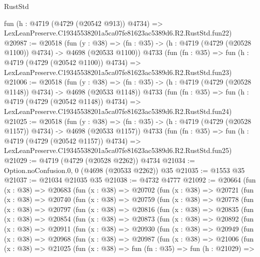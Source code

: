 \begin{lexlean}{RustStd}
\begin{coremodule}
    fun (h : @4719 (@4729 (@20542 @913)) @4734) =>
    LexLeanPreserve.C19345538201a5ca07fe81623ac5389d6.R2.RustStd.fun22)
@20987 := @20518
    (fun (y : @38) =>
    (fn : @35) -> (h : @4719 (@4729 (@20528 @1100)) @4734) -> @4698 (@20533 @1100))
    @4733
    (fun (fn : @35) =>
    fun (h : @4719 (@4729 (@20542 @1100)) @4734) =>
    LexLeanPreserve.C19345538201a5ca07fe81623ac5389d6.R2.RustStd.fun23)
@21006 := @20518
    (fun (y : @38) =>
    (fn : @35) -> (h : @4719 (@4729 (@20528 @1148)) @4734) -> @4698 (@20533 @1148))
    @4733
    (fun (fn : @35) =>
    fun (h : @4719 (@4729 (@20542 @1148)) @4734) =>
    LexLeanPreserve.C19345538201a5ca07fe81623ac5389d6.R2.RustStd.fun24)
@21025 := @20518
    (fun (y : @38) =>
    (fn : @35) -> (h : @4719 (@4729 (@20528 @1157)) @4734) -> @4698 (@20533 @1157))
    @4733
    (fun (fn : @35) =>
    fun (h : @4719 (@4729 (@20542 @1157)) @4734) =>
    LexLeanPreserve.C19345538201a5ca07fe81623ac5389d6.R2.RustStd.fun25)
@21029 := @4719 (@4729 (@20528 @2262)) @4734
@21034 := Option.noConfusion.{0, 0} (@4698 (@20533 @2262)) @35
@21035 := @1553 @35
@21037 := @21034 @21035 @35
@21038 := @4732 @4777
@21092 := @20664
    (fun (x : @38) =>
    @20683
      (fun (x : @38) =>
      @20702
        (fun (x : @38) =>
        @20721
          (fun (x : @38) =>
          @20740
            (fun (x : @38) =>
            @20759
              (fun (x : @38) =>
              @20778
                (fun (x : @38) =>
                @20797
                  (fun (x : @38) =>
                  @20816
                    (fun (x : @38) =>
                    @20835
                      (fun (x : @38) =>
                      @20854
                        (fun (x : @38) =>
                        @20873
                          (fun (x : @38) =>
                          @20892
                            (fun (x : @38) =>
                            @20911
                              (fun (x : @38) =>
                              @20930
                                (fun (x : @38) =>
                                @20949
                                  (fun (x : @38) =>
                                  @20968
                                    (fun (x : @38) =>
                                    @20987
                                      (fun (x : @38) =>
                                      @21006
                                        (fun (x : @38) =>
                                        @21025
                                          (fun (x : @38) =>
                                          fun (fn : @35) =>
                                          fun (h : @21029) =>

\end{coremodule}
\end{lexlean}
